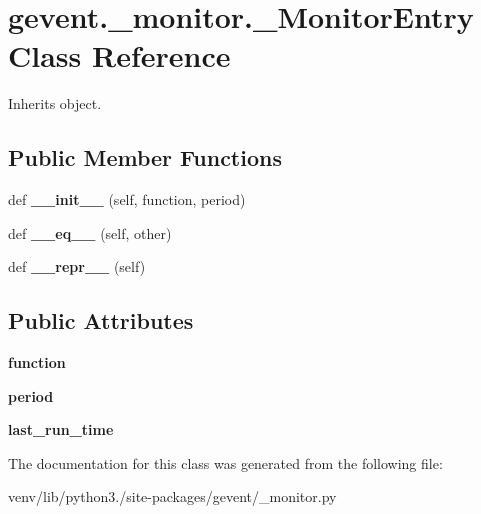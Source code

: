 \hypertarget{classgevent_1_1__monitor_1_1___monitor_entry}{}\section{gevent.\+\_\+monitor.\+\_\+\+Monitor\+Entry Class Reference}
\label{classgevent_1_1__monitor_1_1___monitor_entry}


Inherits object.

\subsection*{Public Member Functions}
\begin{DoxyCompactItemize}
\item 
\mbox{\label{classgevent_1_1__monitor_1_1___monitor_entry_a1143e16cd431488f959b1f64edf5fd10}} 
def {\bfseries \+\_\+\+\_\+init\+\_\+\+\_\+} (self, function, period)
\item 
\mbox{\label{classgevent_1_1__monitor_1_1___monitor_entry_ab5fd152618b44a3665a5035624b62464}} 
def {\bfseries \+\_\+\+\_\+eq\+\_\+\+\_\+} (self, other)
\item 
\mbox{\label{classgevent_1_1__monitor_1_1___monitor_entry_a884a1696a8178eec851a3498da1f20a1}} 
def {\bfseries \+\_\+\+\_\+repr\+\_\+\+\_\+} (self)
\end{DoxyCompactItemize}
\subsection*{Public Attributes}
\begin{DoxyCompactItemize}
\item 
\mbox{\label{classgevent_1_1__monitor_1_1___monitor_entry_a7a700c86498d296a39527280757d1905}} 
{\bfseries function}
\item 
\mbox{\label{classgevent_1_1__monitor_1_1___monitor_entry_abb38c705e389c3b77c6250fe9067e583}} 
{\bfseries period}
\item 
\mbox{\label{classgevent_1_1__monitor_1_1___monitor_entry_a413afdcdce7898d5deb2cfcf287f5304}} 
{\bfseries last\+\_\+run\+\_\+time}
\end{DoxyCompactItemize}


The documentation for this class was generated from the following file\+:\begin{DoxyCompactItemize}
\item 
venv/lib/python3./site-\/packages/gevent/\+\_\+monitor.\+py\end{DoxyCompactItemize}
